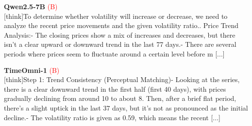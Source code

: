 \noindent
\begin{minipage}[t]{0.28\textwidth}
\colorbox{red!8}{\parbox{\dimexpr\textwidth-2\fboxsep}{
\textbf{Qwen2.5-7B} \textcolor{red}{(B)} \\[2pt]
\tiny
[think]\newline To determine whether volatility will increase or decrease, we need to analyze the recent price movements and the given volatility ratio.. Price Trend Analysis:\newline    - The closing prices show a mix of increases and decreases, but there isn't a clear upward or downward trend in the last 77 days.\newline    - There are several periods where prices seem to fluctuate around a certain level before m [...]
}}
\end{minipage}
\hfill
\begin{minipage}[t]{0.28\textwidth}
\colorbox{red!8}{\parbox{\dimexpr\textwidth-2\fboxsep}{
\textbf{TimeOmni-1} \textcolor{red}{(B)} \\[2pt]
\tiny
[think]\newline Step 1: Trend Consistency (Perceptual Matching)\newline - Looking at the series, there is a clear downward trend in the first half (first  40 days), with prices gradually declining from around 10 to about 8. Then, after a brief flat period, there's a slight uptick in the last 37 days, but it's not as pronounced as the initial decline.\newline - The volatility ratio is given as 0.59, which means the recent [...]
}}
\end{minipage}
\hfill
